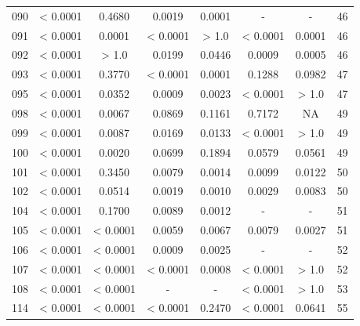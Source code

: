 {\begin{longtable}{cccccccc}
090 & {\color{red} < 0.0001} & 0.4680 & {\color{red}0.0019} & {\color{red}0.0001} & - & - &  46 \\
091 & {\color{red} < 0.0001} & {\color{red}0.0001} & {\color{red} < 0.0001} & > 1.0 & {\color{red} < 0.0001} & {\color{red}0.0001} & 46 \\
092 & {\color{red} < 0.0001} & > 1.0 & {\color{red}0.0199} & {\color{red}0.0446} & {\color{red}0.0009} & {\color{red}0.0005} & 46 \\
093 & {\color{red} < 0.0001} & 0.3770 & {\color{red} < 0.0001} & {\color{red}0.0001} & {\color{red}0.1288} & 0.0982 & 47 \\
095 & {\color{red} < 0.0001} & {\color{red}0.0352} & {\color{red}0.0009} & {\color{red}0.0023} & {\color{red} < 0.0001} & > 1.0 & 47 \\
098 & {\color{red} < 0.0001} & {\color{red}0.0067} & 0.0869 & 0.1161 & 0.7172 & NA & 49 \\
099 & {\color{red} < 0.0001} & {\color{red}0.0087} & {\color{red}0.0169} & {\color{red}0.0133} & {\color{red} < 0.0001} & > 1.0 & 49 \\
100 & {\color{red} < 0.0001} & {\color{red}0.0020} & 0.0699 & 0.1894 & 0.0579 & 0.0561 & 49 \\
101 & {\color{red} < 0.0001} & 0.3450 & {\color{red}0.0079} & {\color{red}0.0014} & {\color{red}0.0099} & {\color{red}0.0122} & 50 \\
102 & {\color{red} < 0.0001} & 0.0514 & {\color{red}0.0019} & {\color{red}0.0010} & {\color{red}0.0029} & {\color{red}0.0083} & 50 \\
104 & {\color{red} < 0.0001} & 0.1700 & {\color{red}0.0089} & {\color{red}0.0012} & - & - &  51 \\
105 & {\color{red} < 0.0001} & {\color{red} < 0.0001} & {\color{red}0.0059} & {\color{red}0.0067} & {\color{red}0.0079} & {\color{red}0.0027} & 51 \\
106 & {\color{red} < 0.0001} & {\color{red} < 0.0001} & {\color{red}0.0009} & {\color{red}0.0025} & - & - &  52 \\
107 & {\color{red} < 0.0001} & {\color{red} < 0.0001} & {\color{red} < 0.0001} & {\color{red}0.0008} & {\color{red} < 0.0001} & > 1.0 & 52 \\
108 & {\color{red} < 0.0001} & {\color{red} < 0.0001} & - & - & {\color{red} < 0.0001} & > 1.0 & 53 \\
114 & {\color{red} < 0.0001} & {\color{red} < 0.0001} & {\color{red} < 0.0001} & 0.2470 & {\color{red} < 0.0001} & 0.0641 & 55 \\

\end{longtable}}
